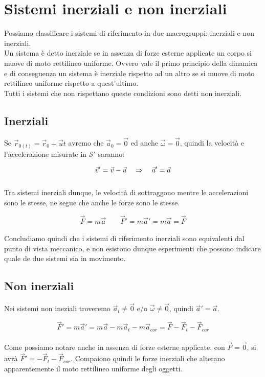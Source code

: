 \section{Sistemi inerziali e non inerziali}
Possiamo classificare i sistemi di riferimento in due macrogruppi: inerziali
e non inerziali.\\
Un sistema è detto inerziale se in assenza di forze esterne applicate un corpo
si muove di moto rettilineo uniforme. Ovvero vale il primo principio della
dinamica e di conseguenza un sistema è inerziale rispetto ad un altro se si
muove di moto rettilineo uniforme rispetto a quest'ultimo.\\
Tutti i sistemi che non rispettano queste condizioni sono detti non inerziali.

\subsection{Inerziali}

Se $\vec r_{0(t)} = \vec r_0 + \vec u t$ avremo che $\vec a_0 = \vec0$ ed
anche $\vec\omega = \vec 0$, quindi la velocità e l'accelerazione misurate
in $\mathcal{S'}$ saranno:

\begin{equation}
    \vec v' = \vec v - \vec u \quad\Rightarrow\quad \vec a' = \vec a
\end{equation}
\\
Tra sistemi inerziali dunque, le velocità di sottraggono mentre le accelerazioni
sono le stesse, ne segue che anche le forze sono le stesse.

\begin{equation}
    \vec F = m\vec a\qquad \vec F' = m\vec a' = m\vec a = \vec F
\end{equation}
\\
Concludiamo quindi che i sistemi di riferimento inerziali sono equivalenti dal
punto di vista meccanico, e non esistono dunque esperimenti che possono indicare
quale de due sistemi sia in movimento.

\subsection{Non inerziali}

Nei sistemi non ineziali troveremo $\vec a_t \ne \vec0$ e/o $\vec\omega \ne \vec 0$,
quindi $\vec a' = \vec a$.

\begin{equation}
        \vec F' = m\vec a' = m\vec a -m\vec a_t - m\vec a_{cor} = \vec F -
        \vec F_t -\vec F_{cor}
\end{equation}
\\
Come possiamo notare anche in assenza di forze esterne applicate, con
$\vec F = \vec 0$, si avrà $\vec F' = - \vec F_t -\vec F_{cor}$. Compaiono
quindi le forze inerziali che alterano apparentemente il moto rettilineo
uniforme degli oggetti.